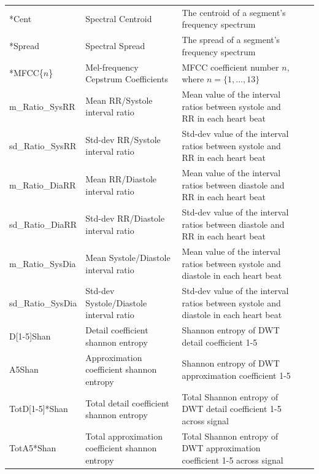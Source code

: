 \documentclass[titlepage, 12pt]{scrartcl} \usepackage{enumitem}
\begin{document}
\begin{table}[H]
\begin{tabulary}{\linewidth}{LLLLL}
*Cent                      & Spectral Centroid                               & The centroid of a segment's frequency spectrum                                       \\
*Spread                    & Spectral Spread                                 & The spread of a segment's frequency spectrum                                         \\
*MFCC\{$n$\} & Mel-frequency Cepstrum Coefficients             & MFCC coefficient number $n$, where $n = \{1, \ldots, 13\}$                           \\
m\_Ratio\_SysRR            & Mean RR/Systole interval ratio                  & Mean value of the interval ratios between systole and RR in each heart beat          \\
sd\_Ratio\_SysRR           & Std-dev RR/Systole interval ratio               & Std-dev value of the interval ratios between systole and RR in each heart beat       \\
m\_Ratio\_DiaRR            & Mean RR/Diastole interval ratio                 & Mean value of the interval ratios between diastole and RR in each heart beat         \\
sd\_Ratio\_DiaRR           & Std-dev RR/Diastole interval ratio              & Std-dev value of the interval ratios between diastole and RR in each heart beat      \\
m\_Ratio\_SysDia           & Mean Systole/Diastole interval ratio            & Mean value of the interval ratios between systole and diastole in each heart beat    \\
sd\_Ratio\_SysDia          & Std-dev Systole/Diastole interval ratio         & Std-dev value of the interval ratios between systole and diastole in each heart beat \\
D[1-5]Shan             & Detail coefficient shannon entropy              & Shannon entropy of DWT detail coefficient 1-5                                        \\
A5Shan                     & Approximation coefficient shannon entropy       & Shannon entropy of DWT approximation coefficient 1-5                                 \\
\mbox{TotD[1-5]*Shan}         & Total detail coefficient shannon entropy        & Total Shannon entropy of DWT detail coefficient 1-5 across signal                    \\
TotA5*Shan                 & Total approximation coefficient shannon entropy & Total Shannon entropy of DWT approximation coefficient 1-5 across signal             \\ \hline
\end{tabulary}
\end{table}
\pagebreak
\end{document}
